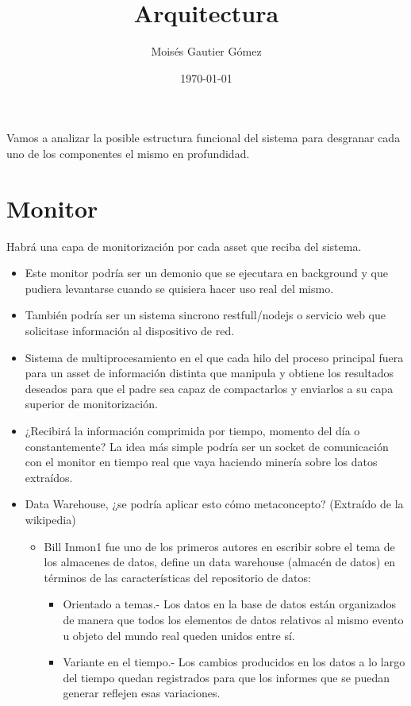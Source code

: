 \documentclass[a4paper,12pt]{article}
\author{Moisés Gautier Gómez}
\title{Arquitectura}
\date{\today}
\begin{document}
\maketitle

Vamos a analizar la posible estructura funcional del sistema para desgranar cada uno de los componentes el mismo en profundidad.

\section{Monitor}

Habrá una capa de monitorización por cada asset que reciba del sistema.
\begin{itemize}
\item Este monitor podría ser un demonio que se ejecutara en background y que pudiera levantarse cuando se quisiera hacer uso real del mismo.
\item También podría ser un sistema sincrono restfull/nodejs o servicio web que solicitase información al dispositivo de red.
\item Sistema de multiprocesamiento en el que cada hilo del proceso principal fuera para un asset de información distinta que manipula y obtiene los resultados deseados para que el padre sea capaz de compactarlos y enviarlos a su capa superior de monitorización.
\item ¿Recibirá la información comprimida por tiempo, momento del día o constantemente? La idea más simple podría ser un socket de comunicación con el monitor en tiempo real que vaya haciendo minería sobre los datos extraídos.
\item Data Warehouse, ¿se podría aplicar esto cómo metaconcepto? (Extraído de la wikipedia)
  \begin{itemize}
  \item Bill Inmon1 fue uno de los primeros autores en escribir sobre el tema de los almacenes de datos, define un data warehouse (almacén de datos) en términos de las características del repositorio de datos:
    \begin{itemize}
    \item Orientado a temas.- Los datos en la base de datos están organizados de manera que todos los elementos de datos relativos al mismo evento u objeto del mundo real queden unidos entre sí.
    \item Variante en el tiempo.- Los cambios producidos en los datos a lo largo del tiempo quedan registrados para que los informes que se puedan generar reflejen esas variaciones.

\end{itemize}
\end{itemize}
\end{itemize}
\end{document}
